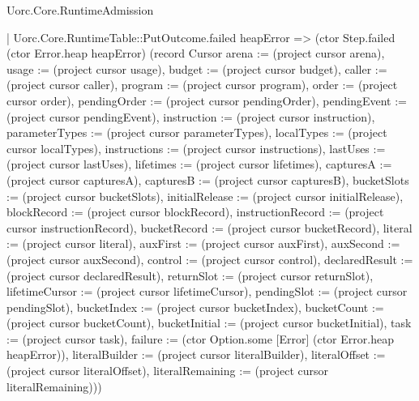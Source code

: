 \begin{lexlean}{Uorc.Core.RuntimeAdmission}
\begin{semanticmodule}
{      | Uorc.Core.RuntimeTable::PutOutcome.failed heapError => (ctor Step.failed (ctor Error.heap heapError) (record Cursor {arena := (project cursor arena), usage := (project cursor usage), budget := (project cursor budget), caller := (project cursor caller), program := (project cursor program), order := (project cursor order), pendingOrder := (project cursor pendingOrder), pendingEvent := (project cursor pendingEvent), instruction := (project cursor instruction), parameterTypes := (project cursor parameterTypes), localTypes := (project cursor localTypes), instructions := (project cursor instructions), lastUses := (project cursor lastUses), lifetimes := (project cursor lifetimes), capturesA := (project cursor capturesA), capturesB := (project cursor capturesB), bucketSlots := (project cursor bucketSlots), initialRelease := (project cursor initialRelease), blockRecord := (project cursor blockRecord), instructionRecord := (project cursor instructionRecord), bucketRecord := (project cursor bucketRecord), literal := (project cursor literal), auxFirst := (project cursor auxFirst), auxSecond := (project cursor auxSecond), control := (project cursor control), declaredResult := (project cursor declaredResult), returnSlot := (project cursor returnSlot), lifetimeCursor := (project cursor lifetimeCursor), pendingSlot := (project cursor pendingSlot), bucketIndex := (project cursor bucketIndex), bucketCount := (project cursor bucketCount), bucketInitial := (project cursor bucketInitial), task := (project cursor task), failure := (ctor Option.some [Error] (ctor Error.heap heapError)), literalBuilder := (project cursor literalBuilder), literalOffset := (project cursor literalOffset), literalRemaining := (project cursor literalRemaining)}))
}
\end{semanticmodule}
\end{lexlean}
